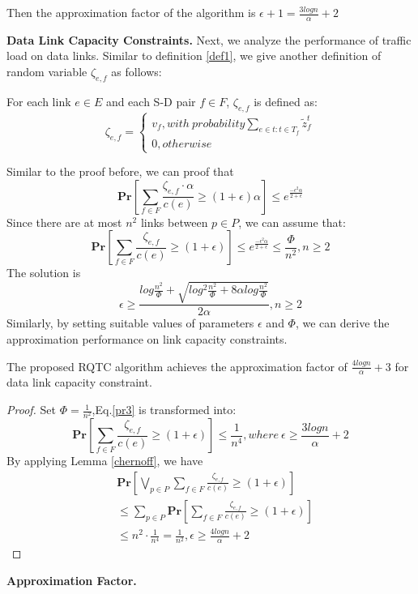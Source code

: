 Then the approximation factor of the algorithm is $\epsilon + 1 = \frac{3logn}{\alpha}+2$

\textbf{Data Link Capacity Constraints.} Next, we analyze the performance of traffic load on data links. Similar to definition \ref{def1}, we give another definition of random variable $\zeta_{e,f}$ as follows:
\begin{definition}
For each link $e \in E$ and each S-D pair $f \in F$, $\zeta_{e,f}$  is defined as:
\begin{equation}
\zeta_{e,f}=
\begin{cases}
     v_f, with \ probability \sum_{e \in t:t \in T_f}\widetilde{z}_f^t \\
     0, otherwise
\end{cases}
\end{equation}
\end{definition}
Similar to the proof before, we can proof that
\begin{equation}\label{pr3}
  \textbf{Pr}[\sum_{f \in F} \frac{\zeta_{e,f} \cdot \alpha}{c(e)} \ge (1+\epsilon)\alpha] \le e^{\frac{-\epsilon^2\alpha}{2+\epsilon}}
\end{equation}
Since there are at most $n^2$ links between $p \in P$, we can assume that:
\begin{equation}\label{pr3}
  \textbf{Pr}[\sum_{f \in F} \frac{\zeta_{e,f}}{c(e)} \ge (1+\epsilon)] \le e^{\frac{-\epsilon^2\alpha}{2+\epsilon}} \le \frac{\Phi}{n^2},n \ge 2
\end{equation}
The solution is
\begin{equation}\label{solution2}
  \epsilon \ge \frac{log\frac{n^2}{\Phi}+\sqrt{log^2\frac{n^2}{\Phi}+8\alpha log\frac{n^2}{\Phi}}}{2\alpha},n \ge 2
\end{equation}
Similarly, by setting suitable values of parameters $\epsilon$ and $\Phi$, we can derive the approximation performance on link capacity constraints.
\begin{theorem}
  The proposed RQTC algorithm achieves the approximation factor of $\frac{4logn}{\alpha}+3$ for data link capacity constraint.
\end{theorem}
\begin{proof}
Set $\Phi = \frac{1}{n^2}$,Eq.\ref{pr3} is transformed into:
\begin{equation}
    \textbf{Pr}[\sum_{f \in F} \frac{\zeta_{e,f}}{c(e)} \ge (1+\epsilon)] \le \frac{1}{n^4},where \ \epsilon \ge \frac{3logn}{\alpha}+2
\end{equation}
By applying Lemma \ref{chernoff}, we have
\begin{equation}
\begin{aligned}
    &\textbf{Pr}[\bigvee_{p \in P}\sum_{f \in F} \frac{\zeta_{e,f}}{c(e)} \ge (1+\epsilon)]\\
    &\le \sum_{p \in P}\textbf{Pr}[\sum_{f \in F} \frac{\zeta_{e,f}}{c(e)} \ge (1+\epsilon)]\\
    &\le n^2 \cdot \frac{1}{n^4} = \frac{1}{n^2}, \epsilon \ge \frac{4logn}{\alpha}+2
\end{aligned}
\end{equation}
\end{proof}
\textbf{Approximation Factor.}




